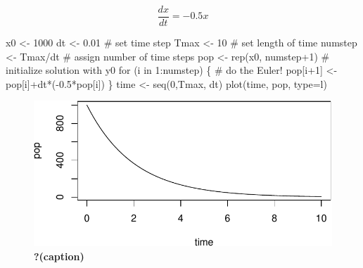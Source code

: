 \documentclass[
  letterpaper,
  DIV=11,
  numbers=noendperiod]{scrreprt}
\newenvironment{Shaded}{\begin{snugshade}}{\end{snugshade}}
\newcommand{\AttributeTok}[1]{\textcolor[rgb]{0.40,0.45,0.13}{#1}}
\newcommand{\CommentTok}[1]{\textcolor[rgb]{0.37,0.37,0.37}{#1}}
\newcommand{\ControlFlowTok}[1]{\textcolor[rgb]{0.00,0.23,0.31}{#1}}
\newcommand{\DecValTok}[1]{\textcolor[rgb]{0.68,0.00,0.00}{#1}}
\newcommand{\FloatTok}[1]{\textcolor[rgb]{0.68,0.00,0.00}{#1}}
\newcommand{\FunctionTok}[1]{\textcolor[rgb]{0.28,0.35,0.67}{#1}}
\newcommand{\NormalTok}[1]{\textcolor[rgb]{0.00,0.23,0.31}{#1}}
\newcommand{\OtherTok}[1]{\textcolor[rgb]{0.00,0.23,0.31}{#1}}
\newcommand{\SpecialCharTok}[1]{\textcolor[rgb]{0.37,0.37,0.37}{#1}}
\newcommand{\StringTok}[1]{\textcolor[rgb]{0.13,0.47,0.30}{#1}}
\begin{document}
\[ 
\frac{dx}{dt} =  -0.5 x 
\]

\begin{Shaded}
\begin{Highlighting}[]
\NormalTok{x0 }\OtherTok{\textless{}{-}} \DecValTok{1000}
\NormalTok{dt }\OtherTok{\textless{}{-}} \FloatTok{0.01} \CommentTok{\# set time step}
\NormalTok{Tmax }\OtherTok{\textless{}{-}} \DecValTok{10} \CommentTok{\# set length of time}
\NormalTok{numstep }\OtherTok{\textless{}{-}}\NormalTok{ Tmax}\SpecialCharTok{/}\NormalTok{dt }\CommentTok{\# assign number of time steps}
\NormalTok{pop }\OtherTok{\textless{}{-}} \FunctionTok{rep}\NormalTok{(x0, numstep}\SpecialCharTok{+}\DecValTok{1}\NormalTok{) }\CommentTok{\# initialize solution with y0}
\ControlFlowTok{for}\NormalTok{ (i }\ControlFlowTok{in} \DecValTok{1}\SpecialCharTok{:}\NormalTok{numstep) \{ }\CommentTok{\# do the Euler!}
\NormalTok{    pop[i}\SpecialCharTok{+}\DecValTok{1}\NormalTok{] }\OtherTok{\textless{}{-}}\NormalTok{ pop[i]}\SpecialCharTok{+}\NormalTok{dt}\SpecialCharTok{*}\NormalTok{(}\SpecialCharTok{{-}}\FloatTok{0.5}\SpecialCharTok{*}\NormalTok{pop[i])}
\NormalTok{\}}
\NormalTok{time }\OtherTok{\textless{}{-}} \FunctionTok{seq}\NormalTok{(}\DecValTok{0}\NormalTok{,Tmax, dt)}
\FunctionTok{plot}\NormalTok{(time, pop, }\AttributeTok{type=}\StringTok{\textquotesingle{}l\textquotesingle{}}\NormalTok{)}
\end{Highlighting}
\end{Shaded}

\begin{figure}[H]

{\centering \includegraphics{./ode_sols_files/figure-pdf/fig-FE-sol-1.pdf}

}

\caption{\label{fig-FE-sol}\textbf{?(caption)}}

\end{figure}
\end{document}
